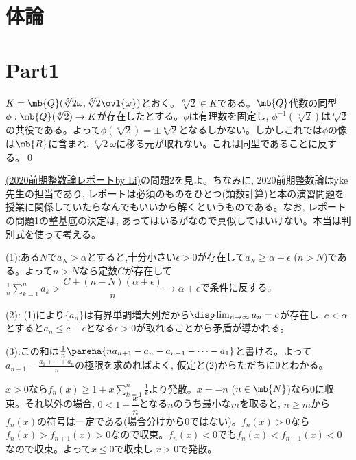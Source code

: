 
\section*{体論}
\section{Part1} \label{section:ans_field_1}
\begin{ans}
$K=\mb{Q}(\sqrt[6]{2}\omega, \sqrt[6]{2}\ovl{\omega})$とおく。$\sqrt[6]{2}\in K$である。$\mb{Q}$代数の同型$\phi:\mb{Q}(\sqrt[6]{2})\to K$が存在したとする。$\phi$は有理数を固定し, $\phi^{-1}(\sqrt[6]{2})$は$\sqrt[6]{2}$の共役である。よって$\phi(\sqrt[6]{2}) = \pm \sqrt[6]{2}$となるしかない。しかしこれでは$\phi$の像は$\mb{R}$に含まれ, $\sqrt[6]{2}\omega$に移る元が取れない。これは同型であることに反する。\qed
\end{ans}
\begin{ans}
\href{https://drive.google.com/file/d/1qjXkWRRvhhL8-TEUwqHF2hy2ZAeKA0Sh/view?usp=sharing}{(2020前期整数論レポートby Li)}の問題2を見よ。ちなみに, 2020前期整数論はyke先生の担当であり, レポートは必須のものをひとつ(類数計算)と本の演習問題を授業に関係していたらなんでもいいから解くというものである。なお, レポートの問題1の整基底の決定は, あってはいるがなので真似してはいけない。本当は判別式を使って考える。
\end{ans}


\begin{ans}
(1):ある$N$で$a_{N} > \alpha$とすると,十分小さい$\epsilon>0$が存在して$a_{N} \geq \alpha + \epsilon$ ($n>N$)である。よって$n>N$なら定数$C$が存在して$\frac{1}{n} \sum_{k=1}^{n}a_k > \dfrac{C + (n - N)(\alpha+\epsilon)}{n} \to \alpha + \epsilon $で条件に反する。

(2): (1)により$\{ a_n \}$は有界単調増大列だから$\disp\lim_{n\to \infty} a_n = c$が存在し, $c<\alpha$とすると$a_n \leq c- \epsilon$となる$\epsilon>0$が取れることから矛盾が導かれる。

(3):この和は$\frac{1}{n}\parena{na_{n+1} - a_{n} - a_{n-1} - \cdots - a_{1}}$と書ける。よって$a_{n+1} - \frac{a_1+\cdots + a_n}{n}$の極限を求めればよく, 仮定と(2)からただちに0とわかる。
\end{ans}
\begin{ans}
$x>0$なら$f_n(x) \geq 1+ x\sum_{k=1}^{n} \frac{1}{k}$より発散。$x=-n$ ($n\in \mb{N}$)なら$0$に収束。それ以外の場合, $0<1+\dfrac{x}{n}$となる$n$のうち最小な$m$を取ると, $n\geq m$から$f_n(x)$の符号は一定である(場合分けから0ではない)。$f_n(x)>0$なら$f_{n}(x) > f_{n+1}(x) > 0$なので収束。$f_{n}(x) < 0$でも$f_{n}(x) < f_{n+1}(x) < 0$なので収束。よって$x\leq 0$で収束し,$x>0$で発散。 

\end{ans}

